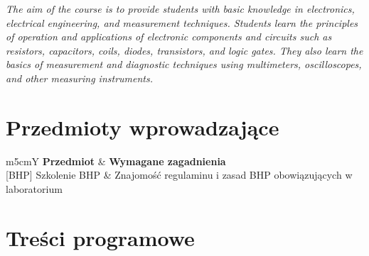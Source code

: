 \documentclass[12pt, a4paper]{article}
\newcommand{\thdrule}{\noalign{\global\setlength{\extrarowheight}{0pt}}}
\newcommand{\thdend}{\noalign{\global\setlength{\extrarowheight}{3pt}}}
\begin{document}
\textit{The aim of the course is to provide students with basic knowledge in electronics, electrical engineering, and measurement techniques. Students learn the principles of operation and applications of electronic components and circuits such as resistors, capacitors, coils, diodes, transistors, and logic gates. They also learn the basics of measurement and diagnostic techniques using multimeters, oscilloscopes, and other measuring instruments.}


\section{Przedmioty wprowadzające}

{\scriptsize
\begin{tabularx}{\textwidth}{m{5cm}Y}
\thdrule\toprule
{} {\color{white}\textbf{Przedmiot}} & {\color{white}\textbf{Wymagane zagadnienia}} \\
\midrule\thdend
   {[}BHP{]} Szkolenie BHP & Znajomość regulaminu i zasad BHP obowiązujących w laboratorium \\
\bottomrule
\end{tabularx}}

\section{Treści programowe}
\end{document}
